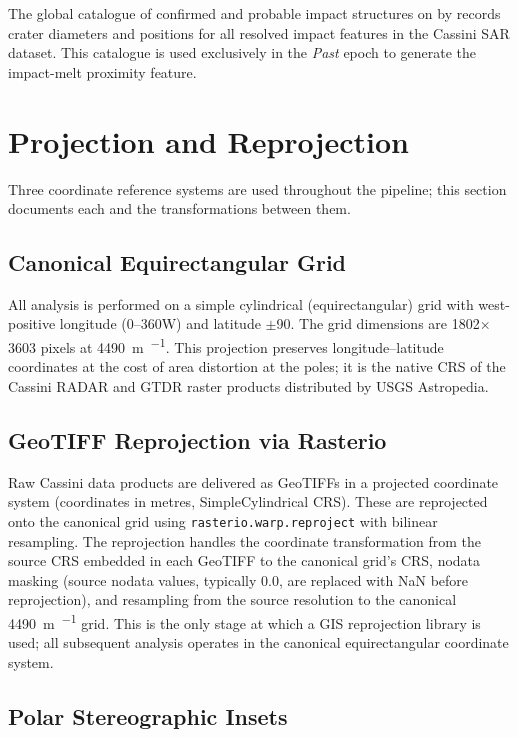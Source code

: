The global catalogue of confirmed and probable impact structures on \titan{}
by \citet{Hedgepeth2020} records crater diameters and positions for all
resolved impact features in the Cassini SAR dataset.  This catalogue is used
exclusively in the \textit{Past} epoch to generate the impact-melt proximity feature.

\section{Projection and Reprojection}
\label{sec:projection}

Three coordinate reference systems are used throughout the pipeline; this section documents each and the transformations between them.

\subsection{Canonical Equirectangular Grid}
\label{sec:equirect}

All analysis is performed on a simple cylindrical (equirectangular) grid with west-positive longitude (0--360\textdegree{}W) and latitude $\pm$90\textdegree{}.  The grid dimensions are 1802$\times$3603 pixels at \SI{4490}{\metre\per{}}.  This projection preserves longitude--latitude coordinates at the cost of area distortion at the poles; it is the native CRS of the Cassini RADAR and GTDR raster products distributed by USGS Astropedia.

\subsection{GeoTIFF Reprojection via Rasterio}
\label{sec:rasterio_reproject}

Raw Cassini data products are delivered as GeoTIFFs in a projected coordinate system (coordinates in metres, SimpleCylindrical CRS).  These are reprojected onto the canonical grid using \texttt{rasterio.warp.reproject} with bilinear resampling.  The reprojection handles the coordinate transformation from the source CRS embedded in each GeoTIFF to the canonical grid's CRS, nodata masking (source nodata values, typically 0.0, are replaced with NaN before reprojection), and resampling from the source resolution to the canonical \SI{4490}{\metre\per{}} grid.  This is the only stage at which a GIS reprojection library is used; all subsequent analysis operates in the canonical equirectangular coordinate system.

\subsection{Polar Stereographic Insets}
\label{sec:polar_stereo}

